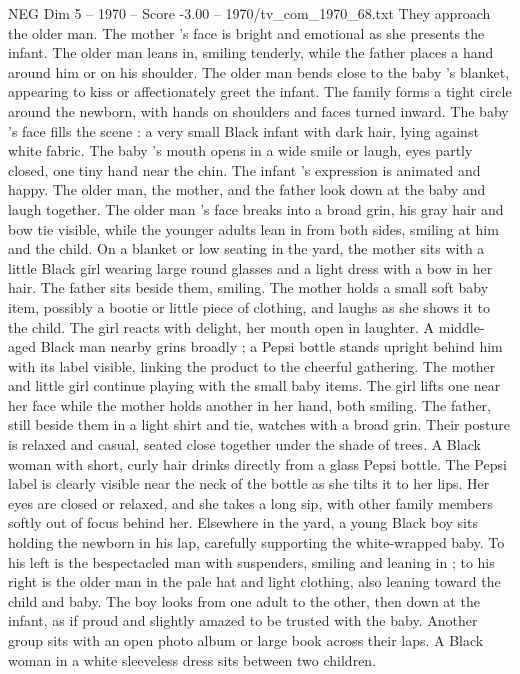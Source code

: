 \begin{textsample}{NEG Dim 5 – 1970 – Score -3.00 – 1970/tv\_com\_1970\_68.txt}
They approach the older man.
The mother ’s face is bright and emotional as she presents the infant.
The older man leans in, smiling tenderly, while the father places a hand around him or on his shoulder.
The older man bends close to the baby ’s blanket, appearing to kiss or affectionately greet the infant.
The family forms a tight circle around the newborn, with hands on shoulders and faces turned inward.
The baby ’s face fills the scene : a very small Black infant with dark hair, lying against white fabric.
The baby ’s mouth opens in a wide smile or laugh, eyes partly closed, one tiny hand near the chin.
The infant ’s expression is animated and happy.
The older man, the mother, and the father look down at the baby and laugh together.
The older man ’s face breaks into a broad grin, his gray hair and bow tie visible, while the younger adults lean in from both sides, smiling at him and the child.
On a blanket or low seating in the yard, the mother sits with a little Black girl wearing large round glasses and a light dress with a bow in her hair.
The father sits beside them, smiling.
The mother holds a small soft baby item, possibly a bootie or little piece of clothing, and laughs as she shows it to the child.
The girl reacts with delight, her mouth open in laughter.
A middle-aged Black man nearby grins broadly ; a Pepsi bottle stands upright behind him with its label visible, linking the product to the cheerful gathering.
The mother and little girl continue playing with the small baby items.
The girl lifts one near her face while the mother holds another in her hand, both smiling.
The father, still beside them in a light shirt and tie, watches with a broad grin.
Their posture is relaxed and casual, seated close together under the shade of trees.
A Black woman with short, curly hair drinks directly from a glass Pepsi bottle.
The Pepsi label is clearly visible near the neck of the bottle as she tilts it to her lips.
Her eyes are closed or relaxed, and she takes a long sip, with other family members softly out of focus behind her.
Elsewhere in the yard, a young Black boy sits holding the newborn in his lap, carefully supporting the white-wrapped baby.
To his left is the bespectacled man with suspenders, smiling and leaning in ; to his right is the older man in the pale hat and light clothing, also leaning toward the child and baby.
The boy looks from one adult to the other, then down at the infant, as if proud and slightly amazed to be trusted with the baby.
Another group sits with an open photo album or large book across their laps.
A Black woman in a white sleeveless dress sits between two children.

\end{textsample}
